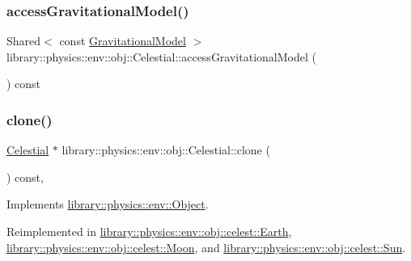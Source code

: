 \mbox{\label{classlibrary_1_1physics_1_1env_1_1obj_1_1_celestial_acbb834f37fa8f0fc7868d41ebb5173ee}} 
\subsubsection{\texorpdfstring{access\+Gravitational\+Model()}{accessGravitationalModel()}}
{\footnotesize\ttfamily Shared$<$ const \hyperlink{namespacelibrary_1_1physics_1_1env_1_1obj_ade509c84a4970a3420c03c058ada152a}{Gravitational\+Model} $>$ library\+::physics\+::env\+::obj\+::\+Celestial\+::access\+Gravitational\+Model (\begin{DoxyParamCaption}{ }\end{DoxyParamCaption}) const}

\mbox{\label{classlibrary_1_1physics_1_1env_1_1obj_1_1_celestial_aaf8aa41a0ff9336eba62c07e3c27f82d}} 
\subsubsection{\texorpdfstring{clone()}{clone()}}
{\footnotesize\ttfamily \hyperlink{classlibrary_1_1physics_1_1env_1_1obj_1_1_celestial}{Celestial} $\ast$ library\+::physics\+::env\+::obj\+::\+Celestial\+::clone (\begin{DoxyParamCaption}{ }\end{DoxyParamCaption}) const\hspace{0.3cm}{\ttfamily [override]}, {\ttfamily [virtual]}}



Implements \hyperlink{classlibrary_1_1physics_1_1env_1_1_object_a498e0d1a15e937a5aa77374c6f899768}{library\+::physics\+::env\+::\+Object}.



Reimplemented in \hyperlink{classlibrary_1_1physics_1_1env_1_1obj_1_1celest_1_1_earth_aca39bec00a2046a3fcef9bf22be52428}{library\+::physics\+::env\+::obj\+::celest\+::\+Earth}, \hyperlink{classlibrary_1_1physics_1_1env_1_1obj_1_1celest_1_1_moon_a9d922ab338809a6c1052edbe11ce3e60}{library\+::physics\+::env\+::obj\+::celest\+::\+Moon}, and \hyperlink{classlibrary_1_1physics_1_1env_1_1obj_1_1celest_1_1_sun_a79fa2d336dad399c3d933b0f5a2f9427}{library\+::physics\+::env\+::obj\+::celest\+::\+Sun}.

